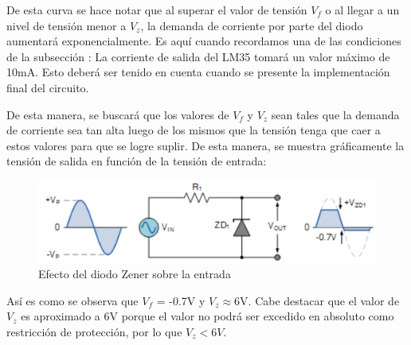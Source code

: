 \documentclass[../../main.tex]{subfiles}
\begin{document}
De esta curva se hace notar que al superar el valor de tensión $V_f$ o al llegar a un nivel de tensión menor a $V_z$, la demanda de corriente por parte del diodo aumentará exponencialmente. Es aquí cuando recordamos una de las condiciones de la subsección : La corriente de salida del LM35 tomará un valor máximo de 10mA. Esto deberá ser tenido en cuenta cuando se presente la implementación final del circuito. \par
De esta manera, se buscará que los valores de $V_f$ y $V_z$ sean tales que la demanda de corriente sea tan alta luego de los mismos que la tensión tenga que caer a estos valores para que se logre suplir. De esta manera, se muestra gráficamente la tensión de salida en función de la tensión de entrada:

\begin{figure}[H]	%
	\centering
	\includegraphics[scale=0.5]{imagenes/zener_diode_efecto.png}
	\caption{Efecto del diodo Zener sobre la entrada}
	\label{fig:ej6_zener_diode_efecto}
\end{figure}

Así es como se observa que $V_f$ = -0.7V y $V_z$$\approx$6V. Cabe destacar que el valor de $V_z$ es aproximado a 6V porque el valor no podrá ser excedido en absoluto como restricción de protección, por lo que $V_z<6V$.
\end{document}
